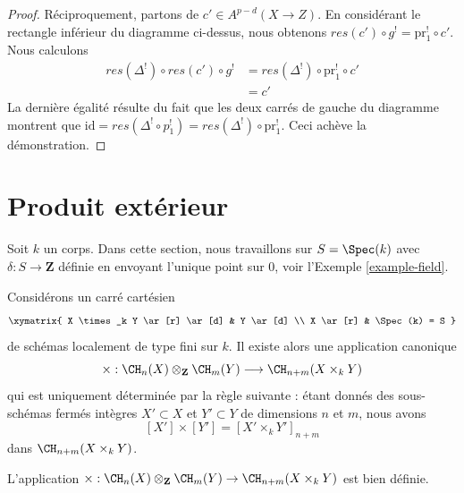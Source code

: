 \begin{proof}
\medskip\noindent
Réciproquement, partons de $c' \in A^{p - d}(X \to Z)$. En considérant
le rectangle inférieur du diagramme ci-dessus, nous obtenons
$res(c') \circ g^! = \text{pr}_1^! \circ c'$.
Nous calculons
\begin{align*}
res(\Delta^!) \circ res(c') \circ g^!
& =
res(\Delta^!) \circ \text{pr}_1^! \circ c' \\
& =
c'
\end{align*}
La dernière égalité résulte du fait que les deux carrés de gauche du
diagramme montrent que
$\text{id} = res(\Delta^! \circ p_1^!) = res(\Delta^!) \circ \text{pr}_1^!$.
Ceci achève la démonstration.
\end{proof}









\section{Produit extérieur}
\label{section-exterior-product}

\noindent
Soit $k$ un corps. Dans cette section, nous travaillons sur $S = \Spec(k)$ avec
$\delta : S \to \mathbf{Z}$ définie en envoyant l'unique point sur $0$, voir
l'Exemple \ref{example-field}.

\medskip\noindent
Considérons un carré cartésien
$$
\xymatrix{
X \times_k Y \ar[r] \ar[d] & Y \ar[d] \\
X \ar[r] & \Spec(k) = S
}
$$
de schémas localement de type fini sur $k$. Il existe alors une application canonique
$$
\times :
\CH_n(X) \otimes_{\mathbf{Z}} \CH_m(Y)
\longrightarrow
\CH_{n + m}(X \times_k Y)
$$
qui est uniquement déterminée par la règle suivante :
étant donnés des sous-schémas fermés intègres $X' \subset X$
et $Y' \subset Y$ de dimensions $n$ et $m$, nous avons
$$
[X'] \times [Y'] = [X' \times_k Y']_{n + m}
$$
dans $\CH_{n + m}(X \times_k Y)$.

\begin{lemma}
\label{lemma-exterior-product-well-defined}
L'application
$\times : \CH_n(X) \otimes_{\mathbf{Z}} \CH_m(Y) \to \CH_{n + m}(X \times_k Y)$
est bien définie.
\end{lemma}

